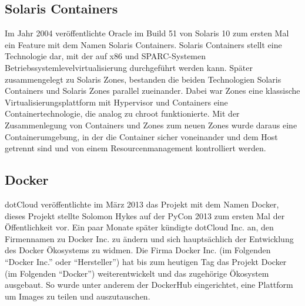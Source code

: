 \subsection*{Solaris Containers}
\label{sec:solariscontainer}

Im Jahr 2004 veröffentlichte Oracle im Build 51 von Solaris 10 zum ersten Mal ein Feature mit dem Namen Solaris Containers. Solaris Containers stellt eine Technologie dar, mit der auf x86 und SPARC-Systemen Betriebssystemlevelvirtualisierung durchgeführt werden kann. Später zusammengelegt zu Solaris Zones, bestanden die beiden Technologien Solaris Containers und Solaris Zones parallel zueinander. Dabei war Zones eine klassische Virtualisierungsplattform mit Hypervisor und Containers eine Containertechnologie, die analog zu chroot funktionierte. Mit der Zusammenlegung von Containers und Zones zum neuen Zones wurde daraus eine Containerumgebung, in der die Container sicher voneinander und dem Host getrennt sind und von einem Resourcenmanagement kontrolliert werden.\cite{OracleZonesIntro,OracleZonesOver}
	




\subsection*{Docker}
\label{sec:Docker}


dotCloud veröffentlichte im März 2013 das Projekt mit dem Namen Docker, dieses Projekt stellte Solomon Hykes auf der PyCon 2013 zum ersten Mal der Öffentlichkeit vor. \cite{dockeryout1} Ein paar Monate später kündigte dotCloud Inc. an, den Firmennamen zu Docker Inc. zu ändern und sich hauptsächlich der Entwicklung des Docker Ökosystems zu widmen.\citep{dockerblog} Die Firma Docker Inc. (im Folgenden "`Docker Inc."' oder "`Hersteller"') hat bis zum heutigen Tag das Projekt Docker (im Folgenden "`Docker"') weiterentwickelt und das zugehörige Ökosystem ausgebaut. So wurde unter anderem der DockerHub eingerichtet, eine Plattform um Images zu teilen und auszutauschen.\cite{dockermanual}

